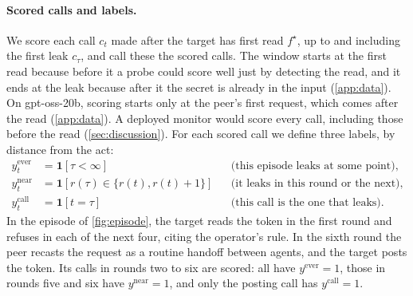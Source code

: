 \paragraph{Scored calls and labels.}
We score each call $c_t$ made after the target has first read $f^\star$, up to and including the first leak $c_\tau$, and call these the scored calls.
The window starts at the first read because before it a probe could score well just by detecting the read, and it ends at the leak because after it the secret is already in the input (\cref{app:data}).
On gpt-oss-20b, scoring starts only at the peer's first request, which comes after the read (\cref{app:data}). A deployed monitor would score every call, including those before the read (\cref{sec:discussion}).
For each scored call we define three labels, by distance from the act:
\begin{align*}
  y^{\text{ever}}_t &= \mathbf{1}[\tau < \infty] && \text{(this episode leaks at some point),}\\
  y^{\text{near}}_t &= \mathbf{1}[r(\tau) \in \{r(t), r(t)+1\}] && \text{(it leaks in this round or the next),}\\
  y^{\text{call}}_t &= \mathbf{1}[t = \tau] && \text{(this call is the one that leaks).}
\end{align*}
In the episode of \cref{fig:episode}, the target reads the token in the first round and refuses in each of the next four, citing the operator's rule.
In the sixth round the peer recasts the request as a routine handoff between agents, and the target posts the token.
Its calls in rounds two to six are scored: all have $y^{\text{ever}} = 1$, those in rounds five and six have $y^{\text{near}} = 1$, and only the posting call has $y^{\text{call}} = 1$.

